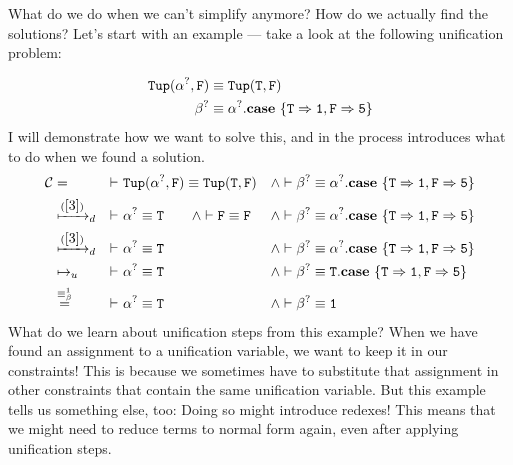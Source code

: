 \documentclass[twoside,12pt,a4paper]{article}
\begin{document}
What do we do when we can't simplify anymore? How do we actually find the solutions?
Let's start with an example --- take a look at the following unification problem:
\begin{example}[Unification]
    \begin{align*}
        \mathtt{Tup(\alpha^?, F)}&\equiv \mathtt{Tup(T, F)}\\
        \beta^?&\equiv \alpha^?.\textbf{case}\ \{\mathtt{T \Rightarrow 1, F\Rightarrow 5}\}
    \end{align*}        
    I will demonstrate how we want to solve this, and in the process introduces what to do when we found a solution.   
    \begin{align*}
        \constraints &= &\vdash\ & \mathtt{Tup(\alphaunifvar, F)}\equiv \mathtt{Tup(T, F)}&\wedge&
        \vdash \betaunifvar\equiv \alphaunifvar.\expatmatch{\mathtt{T \Rightarrow 1, F\Rightarrow 5}}\\
        &\xmapsto{(\cref{3})}_d &\vdash\ & \mathtt{\alphaunifvar\equiv T}\qquad\wedge\vdash \mathtt{F\equiv F} &\wedge& 
        \vdash \betaunifvar\equiv \alphaunifvar.\expatmatch{\mathtt{T \Rightarrow 1, F\Rightarrow 5}}\\
        &\xmapsto{(\cref{3})}_d &\vdash\ & \mathtt{\alphaunifvar\equiv T} &\wedge& 
        \vdash \betaunifvar\equiv \alphaunifvar.\expatmatch{\mathtt{T \Rightarrow 1, F\Rightarrow 5}}\\
        &\mapsto_u &\vdash\ &\mathtt{\alphaunifvar\equiv T} &\wedge&
        \vdash \betaunifvar\equiv \mathtt{T}.\expatmatch{\mathtt{T \Rightarrow 1, F\Rightarrow 5}}\\
        &\stackrel{\betaconv}{=} &\vdash\ &\mathtt{\alphaunifvar\equiv T} &\wedge&
        \vdash \betaunifvar\equiv \mathtt{1}
    \end{align*}
What do we learn about unification steps from this example? When we have found an assignment to a unification variable, we want to keep it in our constraints!
This is because we sometimes have to substitute that assignment in other constraints that contain the same unification variable.
But this example tells us something else, too: Doing so might introduce redexes!
This means that we might need to reduce terms to normal form again, even after applying unification steps. 
\end{example}
\end{document}
